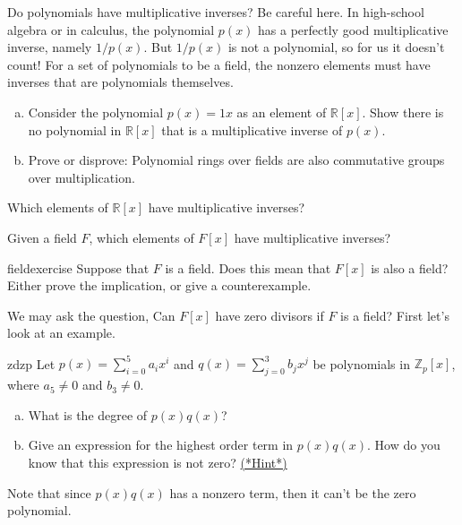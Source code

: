 Do polynomials have multiplicative inverses? Be careful here. In high-school algebra or in calculus,   the polynomial $p(x)$ has a perfectly good multiplicative inverse, namely  $1/p(x)$. But $1/p(x)$ is not a polynomial, so for us it doesn't count! For a set of polynomials to be a field, the nonzero elements must have inverses that are polynomials themselves.

\begin{exercise}{}
\begin{enumerate}[(a)]
\item
Consider the  polynomial $p(x)= 1x$ as an element of $\mathbb{R}[x]$. Show there is no polynomial in $\mathbb{R}[x]$ that is a multiplicative inverse of $p(x)$.
\item
Prove or disprove: Polynomial rings over fields are also commutative groups over multiplication.
\end{enumerate}
\end{exercise}

\begin{exercise}{}
Which elements of $\mathbb{R}[x]$ have multiplicative inverses?
\end{exercise}


\begin{exercise}{}
Given a field $F$, which elements of $F[x]$ have multiplicative inverses?
\end{exercise}

\begin{exercise}{fieldexercise}
Suppose that $F$ is a field. Does this mean that $F[x]$ is also a field? Either prove the implication, or give a counterexample.
\end{exercise}

We may ask the question, Can $F[x]$ have zero divisors if $F$ is a field? First let's look at an example.

\begin{exercise}{zdzp}
Let $p(x)=\sum_{i=0}^{5} a_ix^i$ and $q(x)=\sum_{j=0}^{3} b_jx^j$ be polynomials in $\mathbb{Z}_p[x]$, where $a_5\neq 0$ and $b_3\neq 0$.
\begin{enumerate}[(a)]
\item
What is the degree of $p(x)q(x)$?
\item
Give an expression for the highest order term in $p(x)q(x)$. How do you know that this expression is not zero? \hyperref[ringsHints]{(*Hint*)} 
\end{enumerate}
Note that since $p(x)q(x)$ has a nonzero term, then it can't be the zero polynomial.
\end{exercise}

